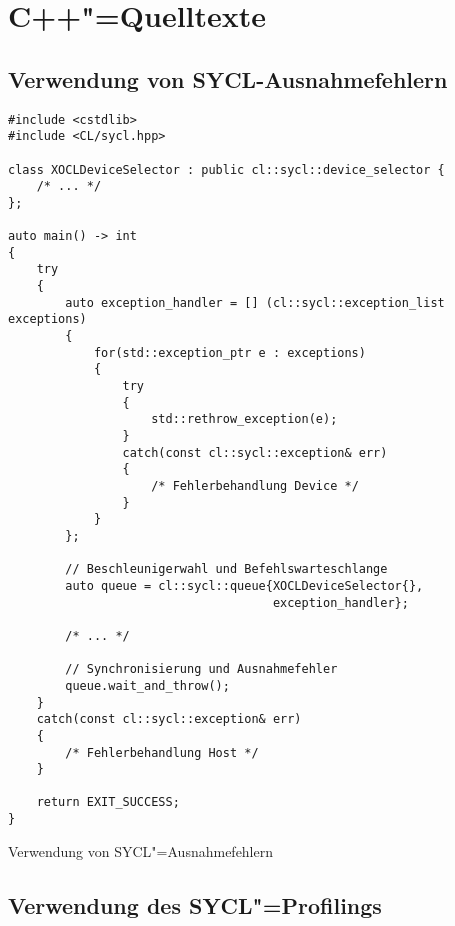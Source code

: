 \section{C++"=Quelltexte}
\label{anhang:source:cpp}

\subsection{Verwendung von SYCL-Ausnahmefehlern}
\label{anhang:source:cpp:syclexceptions}

\begin{code}
    \begin{verbatim}
#include <cstdlib>
#include <CL/sycl.hpp>

class XOCLDeviceSelector : public cl::sycl::device_selector {
    /* ... */
};

auto main() -> int
{
    try
    {
        auto exception_handler = [] (cl::sycl::exception_list exceptions)
        {
            for(std::exception_ptr e : exceptions)
            {
                try
                {
                    std::rethrow_exception(e);
                }
                catch(const cl::sycl::exception& err)
                {
                    /* Fehlerbehandlung Device */
                }
            }
        };

        // Beschleunigerwahl und Befehlswarteschlange
        auto queue = cl::sycl::queue{XOCLDeviceSelector{},
                                     exception_handler};

        /* ... */

        // Synchronisierung und Ausnahmefehler
        queue.wait_and_throw();
    }
    catch(const cl::sycl::exception& err)
    {
        /* Fehlerbehandlung Host */
    }

    return EXIT_SUCCESS;
}
    \end{verbatim}
    \caption{Verwendung von SYCL"=Ausnahmefehlern}
\end{code}

\subsection{Verwendung des SYCL"=Profilings}
\label{anhang:source:cpp:syclprofiling}

